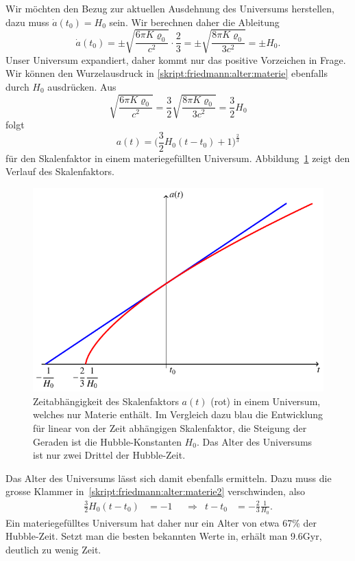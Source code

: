 Wir möchten den Bezug zur aktuellen Ausdehnung des Universums herstellen,
dazu muss $\dot a(t_0)=H_0$ sein.
Wir berechnen daher die Ableitung
\[
\dot a(t_0)=\pm \sqrt{\frac{6\pi K\varrho_0}{c^2}}\cdot \frac23
=
\pm \sqrt{\frac{8\pi K\varrho_0}{3c^2}}
=
\pm H_0.
\]
Unser Universum expandiert, daher kommt nur das positive Vorzeichen in Frage.
Wir können den Wurzelausdruck in \eqref{skript:friedmann:alter:materie} 
ebenfalls durch $H_0$ ausdrücken.
Aus
\[
\sqrt{\frac{6\pi K\varrho_0}{c^2}}
=
\frac32
\sqrt{\frac{8\pi K\varrho_0}{3c^2}}
=
\frac32H_0
\]
folgt
\begin{equation}
a(t) = \biggl(\frac32H_0(t-t_0)+1\biggr)^\frac23
\label{skript:friedmann:alter:materie2}
\end{equation}
für den Skalenfaktor in einem materiegefüllten Universum.
Abbildung~\ref{skript:friedmann:graph:materie} zeigt den Verlauf
des Skalenfaktors.

\begin{figure}
\centering
\includegraphics{chapters/tikz/friedmann-materie.pdf}
\caption{Zeitabhängigkeit des Skalenfaktors $a(t)$ ({\color{red}rot})
in einem Universum, welches nur Materie enthält.
Im Vergleich dazu {\color{blue}blau} die Entwicklung für linear von der
Zeit abhängigen Skalenfaktor, die Steigung der Geraden ist die
Hubble-Konstanten $H_0$.
Das Alter des Universums ist nur zwei Drittel der Hubble-Zeit.
\label{skript:friedmann:graph:materie}}
\end{figure}

Das Alter des Universums lässt sich damit ebenfalls ermitteln.
Dazu muss die grosse Klammer in~\eqref{skript:friedmann:alter:materie2}
verschwinden, also
\begin{equation*}
\begin{aligned}
\frac32H_0(t-t_0)
&=
-1
&&\Rightarrow&
t-t_0
&=
-\frac23 \frac1{H_0}.
\end{aligned}
\end{equation*}
Ein materiegefülltes Universum hat daher nur ein Alter von
etwa 67\% der Hubble-Zeit. 
Setzt man die besten bekannten Werte in, erhält man 9.6Gyr,
deutlich zu wenig Zeit.

